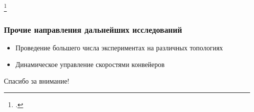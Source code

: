 \documentclass{beamer}
\begin{document}
\begin{frame}
\begin{columns}
\begin{column}{0.4\textwidth}
\begin{center}
      \end{center}
    \end{column}
  \end{columns}
  \footcitetext{geyer2018learning}
\end{frame}





\begin{frame}
  \frametitle{Прочие направления дальнейших исследований}
  \begin{itemize}
  \item Проведение большего числа экспериментах на различных топологиях
  \item Динамическое управление скоростями конвейеров
  \end{itemize}
\end{frame}


\begin{frame}
  \begin{center}
    {\Huge Спасибо за внимание!}
  \end{center}
\end{frame}



\end{document}
